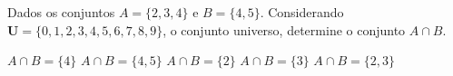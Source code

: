\noindent\parbox{\linewidth}{

Dados os conjuntos $A=\{2,3,4\}$ e $B=\{4,5\}$. Considerando $\mathbf{U}=\{0,1,2,3,4,5,6,7,8,9\}$, o conjunto universo, determine o conjunto $A\cap B$.

$A\cap B=\{4\}$
$A\cap B=\{4,5\}$
$A\cap B=\{2\}$
$A\cap B=\{3\}$
$A\cap B=\{2,3\}$




}


